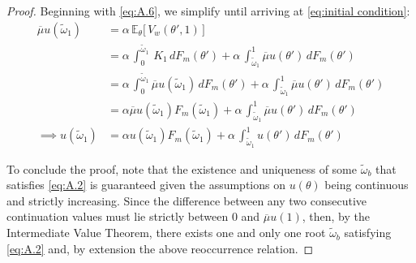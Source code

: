\begin{proof}
Beginning with \ref{eq:A.6}, we simplify until arriving at \autoref{eq:initial condition}: 
\begin{equation*} 
    \begin{split}
        \overline\mu u(\widetilde\omega_1) &= \alpha \, \mathbb{E}_\theta\Big[\,V_w(\theta',1)\,\Big]\\
        &= \alpha \,\int^{\widetilde\omega_1}_0\,K_1\,dF_m(\theta') + \alpha \,\int_{\widetilde\omega_1}^1 \overline\mu u(\theta')\,dF_m(\theta')\\
        &= \alpha \,\int^{\widetilde\omega_1}_0 \overline\mu u(\widetilde\omega_1)\,dF_m(\theta') + \alpha \,\int_{\widetilde\omega_1}^1 \overline\mu u(\theta')\,dF_m(\theta')\\
        &= \alpha \overline\mu u(\widetilde\omega_1)F_m(\widetilde\omega_1) + \alpha \,\int_{\widetilde\omega_1}^1 \overline\mu u(\theta')\,dF_m(\theta')\\
        \implies u(\widetilde\omega_1) &= \alpha u(\widetilde\omega_1)F_m(\widetilde\omega_1) + \alpha \,\int_{\widetilde\omega_1}^1 u(\theta')\,dF_m(\theta') 
    \end{split}
\end{equation*}  

To conclude the proof, note that the existence and uniqueness of some $\widetilde\omega_b$ that satisfies \ref{eq:A.2} is guaranteed given the assumptions on $u(\theta)$ being continuous and strictly increasing. Since the difference between any two consecutive continuation values must lie strictly between 0 and $\overline{\mu}u(1)$, then, by the Intermediate Value Theorem, there exists one and only one root $\widetilde\omega_b$ satisfying \ref{eq:A.2} and, by extension the above reoccurrence relation. 
\end{proof}